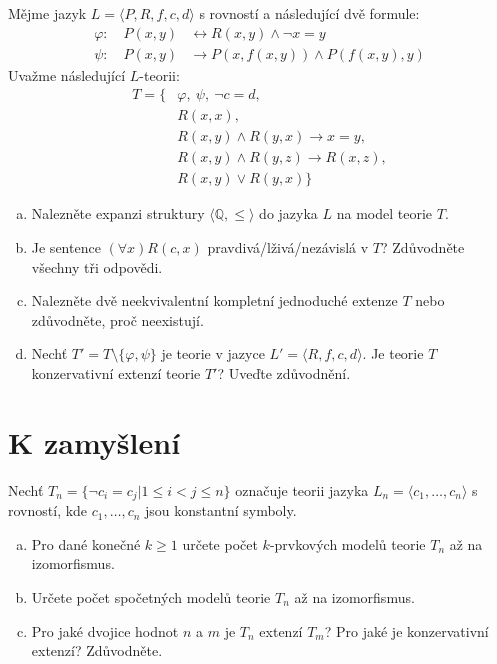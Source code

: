 \begin{problem}

    Mějme jazyk $L=\langle P,R,f,c,d\rangle$ s rovností a následující dvě formule:
    \begin{align*}
        \varphi:\quad P(x,y) &\leftrightarrow R(x,y) \wedge \neg x=y\\
        \psi:\quad P(x,y) &\to P(x,f(x,y)) \wedge P(f(x,y),y)
    \end{align*}
    Uvažme následující $L$-teorii:
    \begin{align*}
        T=\{&\varphi,\ \psi,\ \neg c=d,\\
        &R(x,x),\\ 
        &R(x,y) \wedge R(y,x) \to x=y,\\
        &R(x,y) \wedge R(y,z) \to R(x,z),\\
        &R(x,y) \vee R(y,x)\}    
    \end{align*}
    

    \begin{enumerate}[(a)]
        \item Nalezněte expanzi struktury $\langle \mathbb{Q},\le \rangle$ do jazyka $L$ na model teorie $T$.
        \item Je sentence $(\forall x)R(c,x)$ pravdivá/lživá/nezávislá v $T$? Zdůvodněte všechny tři odpovědi.
        \item Nalezněte dvě neekvivalentní kompletní jednoduché extenze $T$ nebo zdůvodněte, proč neexistují.
        \item Nechť $T'=T\setminus\{\varphi,\psi\}$ je teorie v jazyce $L'=\langle R,f,c,d\rangle$. Je teorie $T$ konzervativní extenzí teorie $T'$? Uveďte zdůvodnění.
    \end{enumerate}

\end{problem}

        
\section*{K zamyšlení}


\begin{problem}

    Nechť $T_n = \{\neg c_i = c_j | 1 \leq i < j \leq n\}$ označuje teorii jazyka $L_n = \langle c_1, \dots, c_n \rangle$ s rovností, kde $c_1, \dots, c_n$ jsou konstantní symboly.
    \begin{enumerate}[(a)]   
        \item Pro dané konečné $k \geq 1$ určete počet $k$-prvkových modelů teorie $T_n$ až na izomorfismus. 
        \item Určete počet spočetných modelů teorie $T_n$ až na izomorfismus. 
        \item Pro jaké dvojice hodnot $n$ a $m$ je $T_n$ extenzí $T_m$? Pro jaké je konzervativní extenzí? Zdůvodněte.
    \end{enumerate}

\end{problem}



